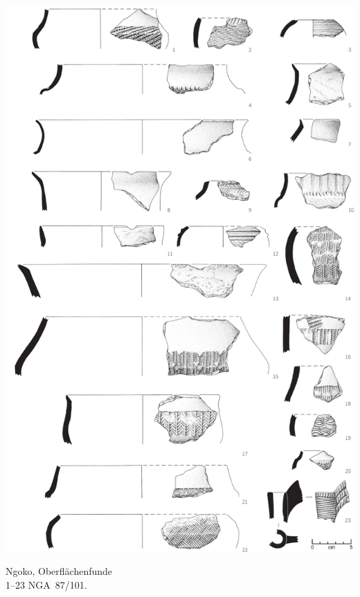 \begin{pl}[H]
	\includegraphics{plt/Taf67.pdf}
	\vspace{.75em}\caption{\mbox{Ngoko}, Oberflächenfunde \\ 1--23 NGA~87/101.}
	\label{pl:67}
\end{pl}

